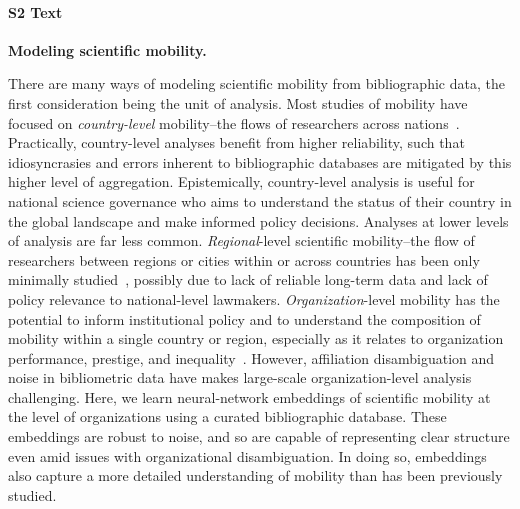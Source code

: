 \documentclass[12pt]{article} %
\begin{document}
%
\paragraph*{S2 Text}
\label{si:text:mobility_models}
{\bf Modeling scientific mobility.}

There are many ways of modeling scientific mobility from bibliographic data, the first consideration being the unit of analysis.
Most studies of mobility have focused on \textit{country-level} mobility--the flows of researchers across nations~\autocite{sugimoto2017mostimpact, scellato2015migrant, robinson-garcia2018indicators, franzoni2012foreign-born}.
Practically, country-level analyses benefit from higher reliability, such that idiosyncrasies and errors inherent to bibliographic databases are mitigated by this higher level of aggregation.
Epistemically, country-level analysis is useful for national science governance who aims to understand the status of their country in the global landscape and make informed policy decisions.
Analyses at lower levels of analysis are far less common.
\textit{Regional}-level scientific mobility--the flow of researchers between regions or cities within or across countries has been only minimally studied~\autocite{vaccario2019mobility}, possibly due to lack of reliable long-term data and lack of policy relevance to national-level lawmakers.
\textit{Organization}-level mobility has the potential to inform institutional policy and to understand the composition of mobility within a single country or region, especially as it relates to organization performance, prestige, and inequality~\autocite{albarran2017topeconomic, deville2014career, morgan2018prestige, clauset2015hierarchy}.
However, affiliation disambiguation and noise in bibliometric data have makes large-scale organization-level analysis challenging.
Here, we learn neural-network embeddings of scientific mobility at the level of organizations using a curated bibliographic database.
These embeddings are robust to noise, and so are capable of representing clear structure even amid issues with organizational disambiguation.
In doing so, embeddings also capture a more detailed understanding of mobility than has been previously studied.
\end{document}
